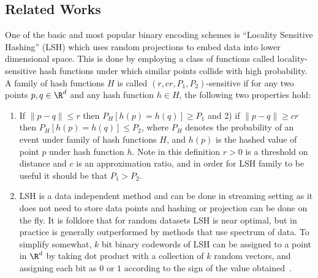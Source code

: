\documentclass{sig-alternate}
\begin{document}
\subsection{Related Works}
One of the basic and most popular binary encoding schemes is ``Locality Sensitive Hashing'' (LSH)\cite{datar2004locality} which uses random projections to embed data into lower dimensional space. This is done by employing a class of functions called locality-sensitive hash functions under which similar points collide with high probability.
A family of hash functions $H$ is called $(r,cr,P_1,P_2)$-sensitive if for any two points $p, q \in \R^d$ and any hash function $h \in H$, the following two properties hold:
\begin{enumerate}
\item{If $\|p - q\| \leq r$ then $P_{H}[h(p) = h(q)] \geq P_1$ and 2) if $\|p - q\| \geq cr$ then $P_{H}[h(p) = h(q)] \leq P_2$, where $P_H$ denotes the probability of an event under family of hash functions $H$, and $h(p)$ is the hashed value of point $p$ under hash function $h$. Note in this definition $r >0 $ is a threshold on distance and $c$ is an approximation ratio, and in order for LSH family to be useful it should be that $P_1 > P_2$.}
\item{LSH is a data independent method and can be done in streaming setting as it does not need to store data points and hashing or projection can be done on the fly. It is folklore that for random datasets LSH is near optimal, but in practice is generally outperformed by methods that use spectrum of data. To simplify somewhat, $k$ bit binary codewords of LSH can be assigned to a point in $\R^d$ by taking dot product with a collection of $k$ random vectors, and assigning each bit as $0$ or $1$ according to the sign of the value obtained~\cite{binarylsh}.}
\end{enumerate} 
\end{document}
